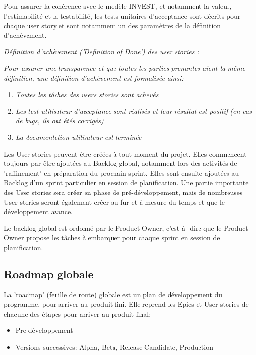 Pour assurer la cohérence avec le modèle INVEST, et notamment la valeur, l’estimabilité et la testabilité, 
les tests unitaires d’acceptance sont décrits pour chaque user story et sont notamment un des paramètres 
de la définition d'achèvement.\\

\noindent%
\hfill%
\begin{minipage}{12cm}
      \textsl{\label{DefofDoneUS}Définition d'achèvement ('Definition of Done') des user stories :}

      \textsl{Pour assurer une transparence et que toutes les parties prenantes aient la même définition, 
une définition d'achèvement est formalisée ainsi:}
\begin{enumerate}     
      \item  \textsl{Toutes les tâches des users stories sont achevés}
      \item  \textsl{Les test utilisateur d’acceptance sont réalisés et leur résultat est positif 
      (en cas de bugs, ils ont étés corrigés)}
      \item  \textsl{La documentation utilisateur est terminée}\\
\end{enumerate}
\end{minipage}


Les User stories peuvent être créées à tout moment du projet. Elles commencent toujours par être ajoutées 
au Backlog global, notamment lors des activités de 'raffinement' en préparation du prochain sprint. 
Elles sont ensuite ajoutées au Backlog d’un sprint particulier en session de planification. 
Une partie importante des User stories sera créer en phase de pré-développement, mais de nombreuses 
User stories seront également créer au fur et à mesure du temps et que le développement avance.

Le backlog global est ordonné par le Product Owner, c'est-à- dire que le Product Owner propose 
les tâches à embarquer pour chaque sprint en session de planification. 


\subsection{Roadmap globale}

La 'roadmap' (feuille de route) globale est un plan de développement du programme, pour arriver au 
produit fini. Elle reprend les Epics et User stories de chacune des étapes pour arriver au produit final:
\begin{itemize}
      \item Pre-développement
      \item Versions successives: Alpha, Beta, Release Candidate, Production
\end{itemize}

